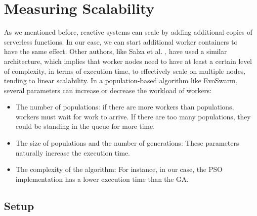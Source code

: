 \documentclass[review]{elsarticle}
\begin{document}
\section{Measuring Scalability}
\label{sec:exp1}
As we mentioned before, reactive systems can scale by adding additional copies
of serverless functions. In our case, we can start additional worker containers
to have the same effect. Other authors, like Salza et al. \cite{salza2019speed},   %
have used a
similar architecture, which implies that worker nodes need to have at least a certain level
of complexity, in terms of execution time,  to effectively scale on multiple
nodes, tending to linear scalability. In a population-based algorithm like
EvoSwarm, several parameters can increase or decrease the workload of workers:

\begin{itemize}
    \item The number of populations: if there are more workers than populations, workers
    must wait for work to arrive. If there are too many populations, they could be
    standing in the queue for more time.
    \item The size of populations and the number of generations:
    These parameters naturally increase the execution time.
    \item The complexity of the algorithm: For instance, in our case,
    the PSO implementation has a lower execution time than the GA.
\end{itemize}

\subsection{Setup}
\end{document}
